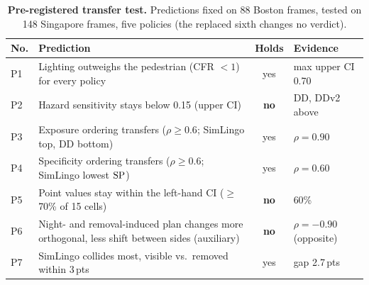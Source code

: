 \begin{table}[t]
\centering
\caption{\textbf{Pre-registered transfer test.} Predictions fixed on 88 Boston frames, tested on 148 Singapore frames, five policies (the replaced sixth changes no verdict).}
\label{tab:prereg}
\footnotesize
\setlength{\tabcolsep}{2.5pt}
\begin{tabular}{@{}lp{4.35cm}cl@{}}
\toprule
No. & Prediction & Holds & Evidence \\
\midrule
P1 & Lighting outweighs the pedestrian (CFR $<1$) for every policy & yes & max upper CI 0.70 \\
P2 & Hazard sensitivity stays below 0.15 (upper CI) & \textbf{no} & DD, DDv2 above \\
P3 & Exposure ordering transfers ($\rho\ge0.6$; SimLingo top, DD bottom) & yes & $\rho=0.90$ \\
P4 & Specificity ordering transfers ($\rho\ge0.6$; SimLingo lowest $\mathrm{SP}$) & yes & $\rho=0.60$ \\
P5 & Point values stay within the left-hand CI ($\ge$70\% of 15 cells) & \textbf{no} & 60\% \\
P6 & Night- and removal-induced plan changes more orthogonal, less shift between sides (auxiliary) & \textbf{no} & $\rho=-0.90$ (opposite) \\
P7 & SimLingo collides most, visible vs.\ removed within 3\,pts & yes & gap 2.7\,pts \\
\bottomrule
\end{tabular}
\end{table}
